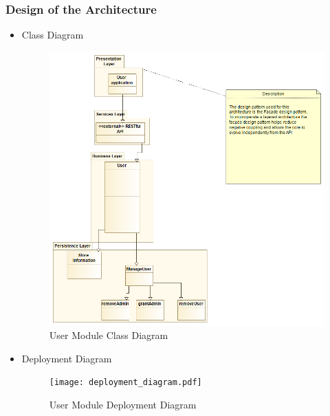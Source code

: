 \documentclass{article}
\begin{document}
	\subsubsection{Design of the Architecture}
		\begin{itemize}
 				\item Class Diagram
 				\begin{center}
					\begin{figure}[!h]
					\includegraphics[scale=0.5]{cdu.png}
					\caption{User Module Class Diagram}
					\end{figure}
				\end{center}
	 			\clearpage
	 			
	 			\item Deployment Diagram				
	 			\begin{center}
	 				\begin{figure}[!h]
	 					\texttt{[image: deployment\_diagram.pdf]}
	 					\caption{User Module Deployment Diagram}
	 				\end{figure}
	 			\end{center}
	 			

\end{itemize}
\end{document}
